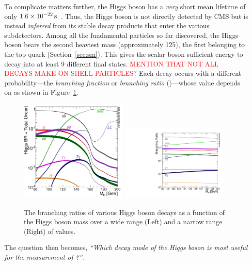 To complicate matters further, the Higgs boson has a \emph{very} short mean lifetime of only $1.6 \times \text{10}^\text{$-$22}\,\text{s}$~\cite{pdg}.
Thus, the Higgs boson is not directly detected by CMS but is instead \emph{inferred} from its stable decay products that enter the various subdetectors.
Among all the fundamental particles so far discovered, the Higgs boson bears the second heaviest mass (approximately 125\GeV), the first belonging to the top quark (Section~\ref{sec:sm}).
This gives the scalar boson sufficient energy to decay into at least 9 different final states.
\textcolor{red}{MENTION THAT NOT ALL DECAYS MAKE ON-SHELL PARTICLES?}
Each decay occurs with a different probability---the \emph{branching fraction} or \emph{branching ratio} (\br)---whose value depends on \mH as shown in Figure~\ref{fig:higgs_br}.
\begin{figure}[!htbp]
    \begin{center}
		\includegraphics[width=0.48\textwidth]{figures/higgsmassmeas/higgs_BR_80to200GeV.pdf}
		\includegraphics[width=0.48\textwidth]{figures/higgsmassmeas/higgs_BR_120to130GeV.pdf}
		\caption{
            The branching ratios of various Higgs boson decays as a function of the Higgs boson mass
            over a wide range (Left) and a narrow range (Right) of values.
            }
		\label{fig:higgs_br}
	\end{center}
\end{figure} 
The question then becomes, \emph{``Which decay mode of the Higgs boson is most useful for the measurement of \mH?''}.

